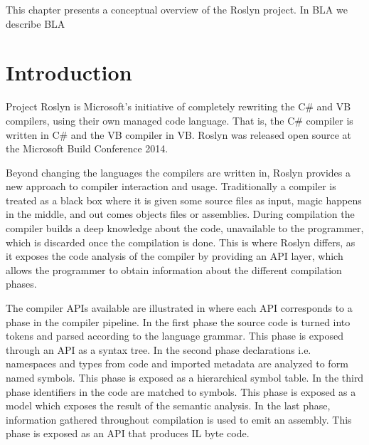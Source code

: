 \makeatletter {}\makeatother
{}
This chapter presents a conceptual overview of the Roslyn project. In BLA we describe BLA

\section{Introduction}
Project Roslyn is Microsoft's initiative of completely rewriting the C\# and \ac{VB} compilers, using their own managed code language. That is, the C\# compiler is written in C\# and the \ac{VB} compiler in \ac{VB}. Roslyn was released open source at the Microsoft Build Conference 2014\cite{csharpBuild}.

Beyond changing the languages the compilers are written in, Roslyn provides a new approach to compiler interaction and usage. Traditionally a compiler is treated as a black box where it is given some source files as input, magic happens in the middle, and out comes objects files or assemblies\cite[p. 3]{ng2012roslyn}. During compilation the compiler builds a deep knowledge about the code, unavailable to the programmer, which is discarded once the compilation is done. This is where Roslyn differs, as it exposes the code analysis of the compiler by providing an API layer, which allows the programmer to obtain information about the different compilation phases\cite[p. 3]{ng2012roslyn}. 

The compiler APIs available are illustrated in  where each API corresponds to a phase in the compiler pipeline. In the first phase the source code is turned into tokens and parsed according to the language grammar. This phase is exposed through an API as a syntax tree. In the second phase declarations i.e. namespaces and types from code and imported metadata are analyzed to form named symbols. This phase is exposed as a hierarchical symbol table. In the third phase identifiers in the code are matched to symbols. This phase is exposed as a model which exposes the result of the semantic analysis. In the last phase, information gathered throughout compilation is used to emit an assembly. This phase is exposed as an API that produces IL byte code\cite[p. 3-4]{ng2012roslyn}.

